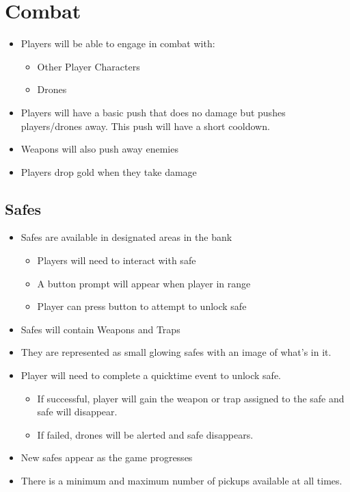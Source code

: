 \documentclass[10pt]{report}
\begin{document}
\section{Combat}

\begin{itemize}
    \item Players will be able to engage in combat with:
    \begin{itemize}
        \item Other Player Characters
        \item Drones
    \end{itemize}
    \item Players will have a basic push that does no damage but pushes players/drones away. This push will have a short cooldown.
    \item Weapons will also push away enemies
    \item Players drop gold when they take damage
\end{itemize}

\subsection{Safes}

\begin{itemize}
    \item Safes are available in designated areas in the bank
    \begin{itemize}
        \item Players will need to interact with safe
        \item A button prompt will appear when player in range
        \item Player can press button to attempt to unlock safe
    \end{itemize}
    \item Safes will contain Weapons and Traps
    \item They are represented as small glowing safes with an image of what’s in it.
    \item Player will need to complete a quicktime event to unlock safe.
    \begin{itemize}
        \item If successful, player will gain the weapon or trap assigned to the safe and safe will disappear.
        \item If failed, drones will be alerted and safe disappears.
    \end{itemize}
    \item New safes appear as the game progresses
    \item There is a minimum and maximum number of pickups available at all times.    
\end{itemize}
\end{document}

